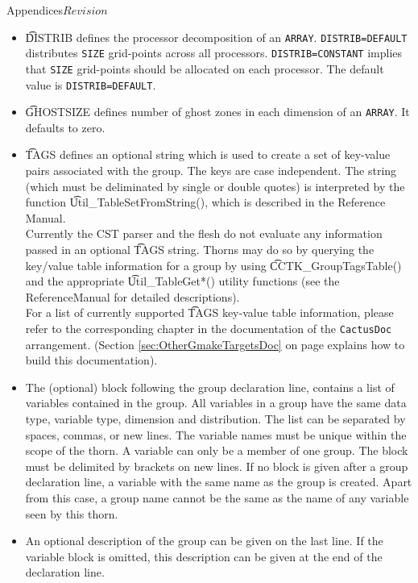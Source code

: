 \begin{cactuspart}{Appendices}{}{$Revision$}
\begin{itemize}
        This should be a comma-separated list of valid arithmetical
        expressions consisting of integers or integer-valued parameters.
\item{} {\t DISTRIB} defines the processor decomposition of an {\tt ARRAY}.
        {\tt DISTRIB=DEFAULT} distributes {\tt SIZE} grid-points
        across all processors. {\tt DISTRIB=CONSTANT} implies that
        {\tt SIZE} grid-points should be allocated on each
        processor. The default value is {\tt DISTRIB=DEFAULT}.
\item{} {\t GHOSTSIZE} defines number of ghost zones in each dimension
of an {\tt ARRAY}.  It defaults to zero.
\item{} {\t TAGS} defines an optional string which is used to create a
	set of key-value pairs associated with the group. The keys are case
	independent.  The string (which must be deliminated by single or
	double quotes) is interpreted by the function
	{\t Util\_TableSetFromString()}, which is described in the
        Reference Manual.\\
        Currently the CST parser and the flesh do not evaluate any information
        passed in an optional {\t TAGS} string. Thorns may do so by
        querying the key/value table information for a group by using
        {\t CCTK\_GroupTagsTable()} and the
        appropriate {\t Util\_TableGet*()} utility functions
        (see the ReferenceManual for detailed descriptions).\\
        For a list of currently supported {\t TAGS} key-value table information,
        please refer to the corresponding chapter in the documentation of the
        \verb|CactusDoc| arrangement. (Section \ref{sec:OtherGmakeTargetsDoc} on
        page \pageref{sec:OtherGmakeTargetsDoc} explains how to build this
        documentation).
\item{} The (optional) block following the group declaration line,
contains a list of variables contained in the group. All variables in
a group have the same data type, variable type, dimension and
distribution. The list
can be separated by spaces, commas, or new lines. The variable names
must be unique within the scope of the thorn.  A variable can only be
a member of one group. The block must be delimited by brackets on new
lines.  If no block is given after a group declaration line, a
variable with the same name as the group is created. Apart from this case, 
a group name cannot be the same as the name of any variable seen by this thorn.
\item{} An optional description of the group can be given on the last
line.  If the variable block is omitted, this description can be given
at the end of the declaration line.
\end{itemize}


\end{cactuspart}
